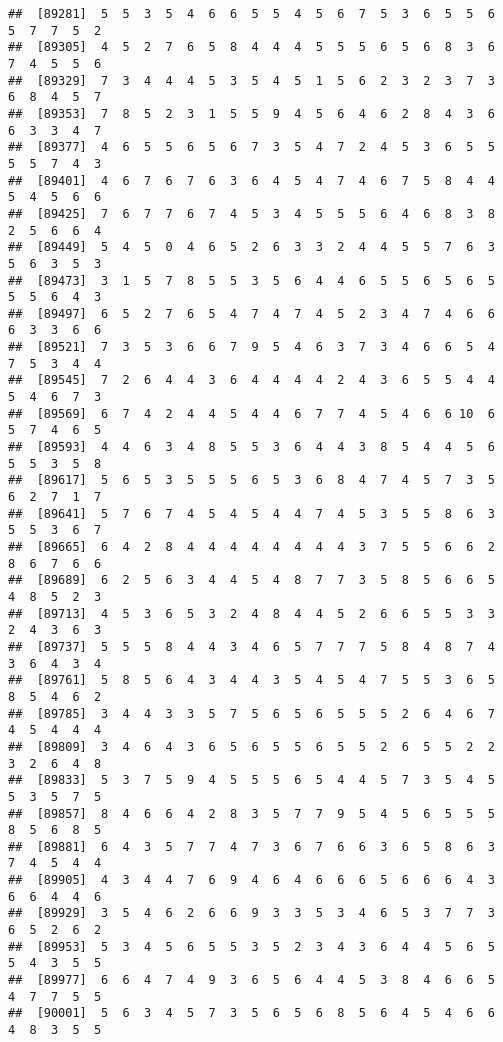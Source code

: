 \documentclass[
]{book}
\begin{document}
\begin{verbatim}
##  [89281]  5  5  3  5  4  6  6  5  5  4  5  6  7  5  3  6  5  5  6  5  7  7  5  2
##  [89305]  4  5  2  7  6  5  8  4  4  4  5  5  5  6  5  6  8  3  6  7  4  5  5  6
##  [89329]  7  3  4  4  4  5  3  5  4  5  1  5  6  2  3  2  3  7  3  6  8  4  5  7
##  [89353]  7  8  5  2  3  1  5  5  9  4  5  6  4  6  2  8  4  3  6  6  3  3  4  7
##  [89377]  4  6  5  5  6  5  6  7  3  5  4  7  2  4  5  3  6  5  5  5  5  7  4  3
##  [89401]  4  6  7  6  7  6  3  6  4  5  4  7  4  6  7  5  8  4  4  5  4  5  6  6
##  [89425]  7  6  7  7  6  7  4  5  3  4  5  5  5  6  4  6  8  3  8  2  5  6  6  4
##  [89449]  5  4  5  0  4  6  5  2  6  3  3  2  4  4  5  5  7  6  3  5  6  3  5  3
##  [89473]  3  1  5  7  8  5  5  3  5  6  4  4  6  5  5  6  5  6  5  5  5  6  4  3
##  [89497]  6  5  2  7  6  5  4  7  4  7  4  5  2  3  4  7  4  6  6  6  3  3  6  6
##  [89521]  7  3  5  3  6  6  7  9  5  4  6  3  7  3  4  6  6  5  4  7  5  3  4  4
##  [89545]  7  2  6  4  4  3  6  4  4  4  4  2  4  3  6  5  5  4  4  5  4  6  7  3
##  [89569]  6  7  4  2  4  4  5  4  4  6  7  7  4  5  4  6  6 10  6  5  7  4  6  5
##  [89593]  4  4  6  3  4  8  5  5  3  6  4  4  3  8  5  4  4  5  6  5  5  3  5  8
##  [89617]  5  6  5  3  5  5  5  6  5  3  6  8  4  7  4  5  7  3  5  6  2  7  1  7
##  [89641]  5  7  6  7  4  5  4  5  4  4  7  4  5  3  5  5  8  6  3  5  5  3  6  7
##  [89665]  6  4  2  8  4  4  4  4  4  4  4  4  3  7  5  5  6  6  2  8  6  7  6  6
##  [89689]  6  2  5  6  3  4  4  5  4  8  7  7  3  5  8  5  6  6  5  4  8  5  2  3
##  [89713]  4  5  3  6  5  3  2  4  8  4  4  5  2  6  6  5  5  3  3  2  4  3  6  3
##  [89737]  5  5  5  8  4  4  3  4  6  5  7  7  7  5  8  4  8  7  4  3  6  4  3  4
##  [89761]  5  8  5  6  4  3  4  4  3  5  4  5  4  7  5  5  3  6  5  8  5  4  6  2
##  [89785]  3  4  4  3  3  5  7  5  6  5  6  5  5  5  2  6  4  6  7  4  5  4  4  4
##  [89809]  3  4  6  4  3  6  5  6  5  5  6  5  5  2  6  5  5  2  2  3  2  6  4  8
##  [89833]  5  3  7  5  9  4  5  5  5  6  5  4  4  5  7  3  5  4  5  5  3  5  7  5
##  [89857]  8  4  6  6  4  2  8  3  5  7  7  9  5  4  5  6  5  5  5  8  5  6  8  5
##  [89881]  6  4  3  5  7  7  4  7  3  6  7  6  6  3  6  5  8  6  3  7  4  5  4  4
##  [89905]  4  3  4  4  7  6  9  4  6  4  6  6  6  5  6  6  6  4  3  6  6  4  4  6
##  [89929]  3  5  4  6  2  6  6  9  3  3  5  3  4  6  5  3  7  7  3  6  5  2  6  2
##  [89953]  5  3  4  5  6  5  5  3  5  2  3  4  3  6  4  4  5  6  5  5  4  3  5  5
##  [89977]  6  6  4  7  4  9  3  6  5  6  4  4  5  3  8  4  6  6  5  4  7  7  5  5
##  [90001]  5  6  3  4  5  7  3  5  6  5  6  8  5  6  4  5  4  6  6  4  8  3  5  5

\end{verbatim}
\end{document}
